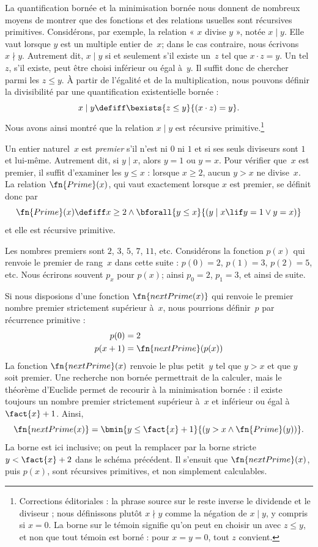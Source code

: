 \documentclass[../../../include/open-logic-section]{subfiles}
\begin{document}

La quantification bornée et la minimisation bornée nous donnent
de nombreux moyens de montrer que des fonctions et des relations
usuelles sont récursives primitives. Considérons, par exemple,
la relation « $x$ divise $y$ », notée $x \mid y$. Elle vaut lorsque
$y$ est un multiple entier de~$x$; dans le cas contraire, nous
écrivons $x \nmid y$. Autrement dit, $x \mid y$ si et seulement
s'il existe un~$z$ tel que $x\cdot z=y$. Un tel~$z$, s'il existe,
peut être choisi inférieur ou égal à~$y$. Il suffit donc de
chercher parmi les $z\leq y$. À partir de l'égalité et de la
multiplication, nous pouvons définir la divisibilité par une
quantification existentielle bornée :
\[
x \mid y \defiff \bexists{z \leq y}{(x \cdot z) = y}.
\]
Nous avons ainsi montré que la relation $x\mid y$ est récursive
primitive.\footnote{Corrections éditoriales : la phrase source sur le reste inverse le dividende et le diviseur ; nous définissons plutôt $x\nmid y$ comme la négation de $x\mid y$, y compris si $x=0$. La borne sur le témoin signifie qu'on peut en choisir un avec $z\leq y$, et non que tout témoin est borné : pour $x=y=0$, tout $z$ convient.}

Un entier naturel~$x$ est \emph{premier} s'il n'est ni $0$ ni
$1$ et si ses seuls diviseurs sont $1$ et lui-même. Autrement
dit, si $y\mid x$, alors $y=1$ ou $y=x$. Pour vérifier que~$x$
est premier, il suffit d'examiner les $y\leq x$ : lorsque
$x\geq2$, aucun $y>x$ ne divise~$x$. La relation
$\fn{Prime}(x)$, qui vaut exactement lorsque $x$ est premier,
se définit donc par
\[
\fn{Prime}(x) \defiff x \geq 2 \land \bforall{y \leq x}{(y \mid x \lif y
  = 1 \lor y = x)}
\]
et elle est récursive primitive.

Les nombres premiers sont $2$, $3$, $5$, $7$, $11$, etc.
Considérons la fonction $p(x)$ qui renvoie le premier de rang~$x$
dans cette suite : $p(0)=2$, $p(1)=3$, $p(2)=5$, etc. Nous
écrirons souvent $p_x$ pour $p(x)$; ainsi $p_0=2$, $p_1=3$,
et ainsi de suite.

Si nous disposions d'une fonction $\fn{nextPrime(x)}$ qui
renvoie le premier nombre premier strictement supérieur
à~$x$, nous pourrions définir~$p$ par récurrence primitive :
\begin{align*}
  p(0) & = 2\\
  p(x+1) & = \fn{nextPrime}(p(x))
\end{align*}
La fonction $\fn{nextPrime}(x)$ renvoie le plus petit~$y$
tel que $y>x$ et que $y$ soit premier. Une recherche non
bornée permettrait de la calculer, mais le théorème d'Euclide
permet de recourir à la minimisation bornée : il existe toujours
un nombre premier strictement supérieur à~$x$ et inférieur
ou égal à $\fact{x}+1$. Ainsi,
\[
  \fn{nextPrime(x)} =
  \bmin{y \leq \fact{x}+1}{(y > x \land \fn{Prime}(y))}.
\]
La borne est ici inclusive; on peut la remplacer par la borne
stricte $y<\fact{x}+2$ dans le schéma précédent. Il s'ensuit
que $\fn{nextPrime}(x)$, puis $p(x)$, sont récursives
primitives, et non simplement calculables.
\end{document}
